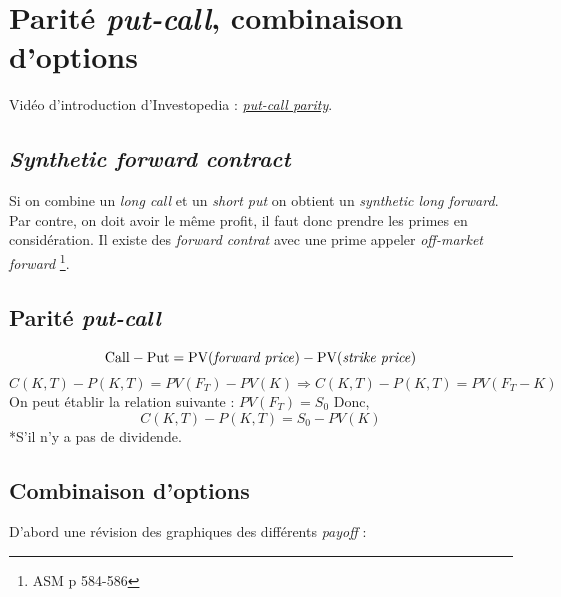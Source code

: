 \documentclass[11pt,french]{report}
\begin{document}

\chapter{Parité \emph{put-call}, combinaison d'options}
\label{put call parity}

Vidéo d'introduction d'Investopedia : \href{http://www.investopedia.com/terms/p/putcallparity.asp?o=40186&l=dir&qsrc=999&qo=investopediaSiteSearch}{\emph{put-call parity}}.

\section{\emph{Synthetic forward contract}}
\label{sec:synthetic forward contract}

Si on combine un \emph{long call} et un \emph{short put} on obtient un \emph{synthetic long forward}. Par contre, on doit avoir le même profit, il faut donc prendre les primes en considération. Il existe des \emph{forward contrat} avec une prime appeler \emph{off-market forward} \footnote{ASM p 584-586}.

\section{Parité \emph{put-call}}


\begin{equation}
\text{Call} - \text{Put} = \text{PV(\emph{forward price})} - \text{PV(\emph{strike price})}
\end{equation}
\begin{equation}
C(K,T) - P(K,T) = PV(F_{T}) - PV(K) \Rightarrow C(K,T) - P(K,T) = PV(F_{T} - K)
\end{equation}
On peut établir la relation suivante : $ PV(F_{T}) = S_0$
Donc, 
\begin{equation}
C(K,T) - P(K,T) = S_0 - PV(K)
\end{equation}
*S'il n'y a pas de dividende.

\section{Combinaison d'options}
\label{sec:combinaison}

D'abord une révision des graphiques des différents \emph{payoff} :
\end{document}
